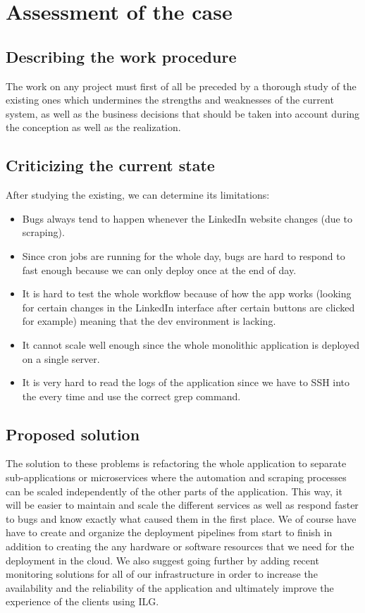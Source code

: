 \section{Assessment of the case}
\subsection{Describing the work procedure}
The work on any project must first of all be preceded by a thorough study of the existing ones which undermines the strengths and weaknesses of the current system, as well as the business decisions that should be taken into account during the conception as well as the realization.
\subsection{Criticizing the current state}
After studying the existing, we can determine its limitations:
\begin{itemize}
    \item Bugs always tend to happen whenever the LinkedIn website changes (due to scraping).
    \item Since cron jobs are running for the whole day, bugs are hard to respond to fast enough because we can only deploy once at the end of day.
    \item It is hard to test the whole workflow because of how the app works (looking for certain changes in the LinkedIn interface after certain buttons are clicked for example) meaning that the dev environment is lacking.
    \item It cannot scale well enough since the whole monolithic application is deployed on a single server.
    \item It is very hard to read the logs of the application since we have to SSH into the  every time and use the correct grep command.
\end{itemize}
\subsection{Proposed solution}
The solution to these problems is refactoring the whole application to separate sub-applications or microservices where the automation and scraping processes can be scaled independently of the other parts of the application.
This way, it will be easier to maintain and scale the different services as well as respond faster to bugs and know exactly what caused them in the first place.
We of course have have to create and organize the deployment pipelines from start to finish in addition to creating the any hardware or software resources that we need for the deployment in the cloud.
We also suggest going further by adding recent monitoring solutions for all of our infrastructure in order to increase the availability and the reliability of the application and ultimately improve the experience of the clients using ILG.


